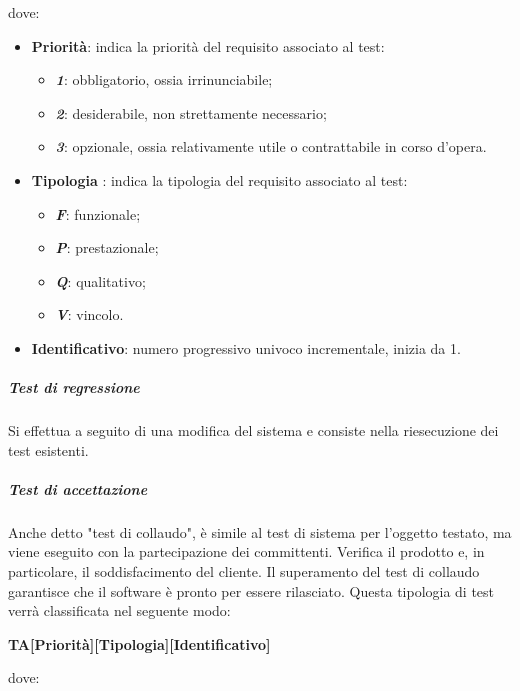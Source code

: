 			dove:
			\begin{itemize}
				\item \textbf{Priorità}: indica la priorità del requisito associato al test:
				\begin{itemize}
					\item \textbf{\textit{1}}: obbligatorio, ossia irrinunciabile;
					\item \textbf{\textit{2}}: desiderabile, non strettamente necessario;
					\item \textbf{\textit{3}}: opzionale, ossia relativamente utile o contrattabile in corso d'opera.
				\end{itemize}
				\item \textbf{Tipologia} : indica la tipologia del requisito associato al test:
				\begin{itemize}
					\item \textbf{\textit{F}}: funzionale;
					\item \textbf{\textit{P}}: prestazionale;
					\item \textbf{\textit{Q}}: qualitativo;
					\item \textbf{\textit{V}}: vincolo.
				\end{itemize}
				\item \textbf{Identificativo}: numero progressivo univoco incrementale, inizia da 1.
			\end{itemize}
			\subparagraph{Test di regressione}
			Si effettua a seguito di una modifica del sistema e consiste nella riesecuzione dei test esistenti.
			\subparagraph{Test di accettazione}
			Anche detto "test di collaudo", è simile al test di sistema per l’oggetto testato, ma viene eseguito con la partecipazione dei committenti. Verifica il prodotto e, in particolare, il soddisfacimento del cliente. Il superamento del test di collaudo garantisce che il software è pronto per essere rilasciato.
			Questa tipologia di test verrà classificata nel seguente modo:
			\begin{center}
				\textbf{TA[Priorità][Tipologia][Identificativo]}
			\end{center}
			dove:
